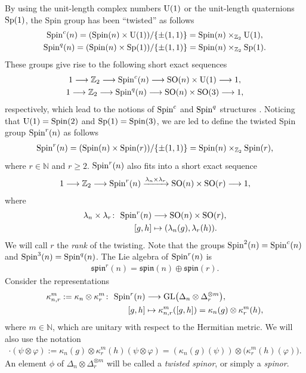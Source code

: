 \documentclass[10pt,a4paper]{amsart}
\newcommand{\lra}{\longrightarrow}
\numberwithin{equation}{section}
\begin{document}
By using the unit-length complex numbers ${\rm U}(1)$ or the unit-length quaternions ${\rm Sp}(1)$, the Spin group has been ``twisted'' as follows
\begin{gather*}
{\rm Spin}^c(n) = ({\rm Spin}(n) \times {\rm U}(1))/\{\pm (1,1)\} = {\rm Spin}(n) \times_{\mathbb{Z}_2} {\rm U}(1),\\
 {\rm Spin}^q(n) = ({\rm Spin}(n) \times {\rm Sp}(1))/\{\pm (1,1)\} = {\rm Spin}(n) \times_{\mathbb{Z}_2} {\rm Sp}(1).\end{gather*}
These groups give rise to the following short exact sequences
\begin{gather*}
1\lra \mathbb{Z}_2\lra {\rm Spin}^c(n)\lra {\rm SO}(n)\times {\rm U}(1)\lra 1,\\
1\lra \mathbb{Z}_2\lra {\rm Spin}^q(n)\lra {\rm SO}(n)\times {\rm SO}(3)\lra 1,\end{gather*}
respectively, which lead to the notions of ${\rm Spin}^c$ and ${\rm Spin}^q$ structures \cite{Friedrich,Lawson,Nagase}. Noticing that ${\rm U}(1)={\rm Spin}(2)$ and ${\rm Sp}(1)={\rm Spin}(3)$, we are led to define the twisted Spin group ${\rm Spin}^r(n)$ as follows
\begin{gather*}
{\rm Spin}^{r}(n) = ({\rm Spin}(n) \times {\rm Spin}(r))/\{\pm (1,1)\} = {\rm Spin}(n) \times_{\mathbb{Z}_2} {\rm Spin}(r),
\end{gather*}
where $r\in\mathbb{N}$ and $r\geq 2$. ${\rm Spin}^r(n)$ also fits into a short exact sequence
\begin{gather*} 1\lra \mathbb{Z}_2\lra {\rm Spin}^r(n)\xrightarrow{\lambda_n\times\lambda_r} {\rm SO}(n)\times {\rm SO}(r)\lra 1,\end{gather*}
where
\begin{align*}
 \lambda_n\times\lambda_r\colon \ {\rm Spin}^r(n)&\longrightarrow {\rm SO}(n)\times {\rm SO}(r),\\
 [g,h] &\mapsto (\lambda_n(g),\lambda_r(h)).
\end{align*}
We will call $r$ the {\em rank} of the twisting. Note that the groups ${\rm Spin}^{2}(n)={\rm Spin}^c(n)$ and ${\rm Spin}^{3}(n)={\rm Spin}^q(n)$. The Lie algebra of ${\rm Spin}^r(n)$ is
\begin{gather*} \mathfrak{spin}^r(n) = \mathfrak{spin}(n) \oplus \mathfrak{spin}(r).\end{gather*}
Consider the representations
\begin{align*}
\kappa_{n,r}^m:=\kappa_n\otimes\kappa_r^m\colon \ {\rm Spin}^r(n)&\longrightarrow {\rm GL}\big(\Delta_n\otimes \Delta_r^{\otimes m}\big),\\
 [g,h] &\mapsto \kappa_{n,r}^m([g,h])=\kappa_n(g)\otimes\kappa_r^m(h),
\end{align*}
where $m\in\mathbb{N}$, which are unitary with respect to the Hermitian metric. We will also use the notation
\begin{gather*} [g,h]\cdot(\psi\otimes\varphi) := \kappa_n(g)\otimes\kappa_r^m(h)(\psi\otimes\varphi) =
(\kappa_n(g)(\psi))\otimes\big(\kappa_r^m(h)(\varphi)\big).\end{gather*}
An element $\phi$ of $\Delta_n\otimes\Delta_r^{\otimes m}$ will be called a {\em twisted spinor}, or simply a {\em spinor}.
\end{document}
